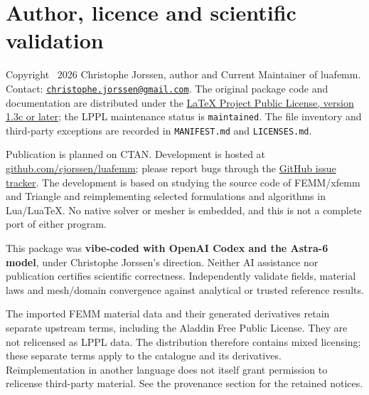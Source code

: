 \section*{Author, licence and scientific validation}
Copyright \textcopyright\ 2026 Christophe Jorssen, author and Current Maintainer
of \textsf{luafemm}. Contact:
\href{mailto:christophe.jorssen@gmail.com}{\nolinkurl{christophe.jorssen@gmail.com}}.
The original package code and documentation are distributed under the
\href{https://www.latex-project.org/lppl/lppl-1-3c.txt}{LaTeX Project Public License,
version 1.3c or later}; the LPPL maintenance status is \texttt{maintained}.
The file inventory and third-party exceptions are recorded in
\texttt{MANIFEST.md} and \texttt{LICENSES.md}.

Publication is planned on CTAN. Development is hosted at
\href{https://github.com/cjorssen/luafemm}{github.com/cjorssen/luafemm};
please report bugs through the
\href{https://github.com/cjorssen/luafemm/issues}{GitHub issue tracker}.
The development is based on studying the source code of FEMM/xfemm and
Triangle and reimplementing selected formulations and algorithms in
Lua/LuaTeX. No native solver or mesher is embedded, and this is not a
complete port of either program.

\medskip
\noindent This package was \textbf{vibe-coded with OpenAI Codex and the Astra-6 model},
under Christophe Jorssen's direction. Neither AI assistance nor publication
certifies scientific correctness. Independently validate fields, material laws
and mesh/domain convergence against analytical or trusted reference results.

\medskip
The imported FEMM material data and their generated derivatives retain
separate upstream terms, including the Aladdin Free Public License.
They are not relicensed as LPPL data. The distribution therefore contains mixed licensing; these separate terms
apply to the catalogue and its derivatives. Reimplementation
in another language does not itself grant permission to relicense
third-party material. See the provenance section for the retained notices.
